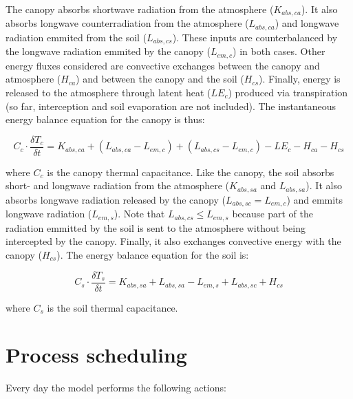 \documentclass[]{book}
\begin{document}
The canopy absorbs shortwave radiation from the atmosphere
(\(K_{abs,ca}\)). It also absorbs longwave counterradiation from the
atmosphere (\(L_{abs,ca}\)) and longwave radiation emmited from the soil
(\(L_{abs,cs}\)). These inputs are counterbalanced by the longwave
radiation emmited by the canopy (\(L_{em,c}\)) in both cases. Other
energy fluxes considered are convective exchanges between the canopy and
atmosphere (\(H_{ca}\)) and between the canopy and the soil
(\(H_{cs}\)). Finally, energy is released to the atmosphere through
latent heat (\(LE_{c}\)) produced via transpiration (so far,
interception and soil evaporation are not included). The instantaneous
energy balance equation for the canopy is thus:

\begin{equation}
  C_{c} \cdot \frac{\delta T_{c}}{\delta t} = K_{abs,ca} + (L_{abs,ca} - L_{em,c}) + (L_{abs,cs} - L_{em,c}) - LE_{c} - H_{ca} - H_{cs} 
\end{equation}

where \(C_{c}\) is the canopy thermal capacitance. Like the canopy, the
soil absorbs short- and longwave radiation from the atmosphere
(\(K_{abs,sa}\) and \(L_{abs,sa}\)). It also absorbs longwave radiation
released by the canopy (\(L_{abs,sc} = L_{em,c}\)) and emmits longwave
radiation (\(L_{em,s}\)). Note that \(L_{abs,cs} \leq L_{em,s}\) because
part of the radiation emmitted by the soil is sent to the atmosphere
without being intercepted by the canopy. Finally, it also exchanges
convective energy with the canopy (\(H_{cs}\)). The energy balance
equation for the soil is:

\begin{equation}
  C_{s} \cdot \frac{\delta T_{s}}{\delta t} = K_{abs,sa} + L_{abs,sa} - L_{em,s} + L_{abs,sc} + H_{cs} 
\end{equation}

where \(C_{s}\) is the soil thermal capacitance.

\section{Process scheduling}\label{process-scheduling-1}

Every day the model performs the following actions:
\end{document}
